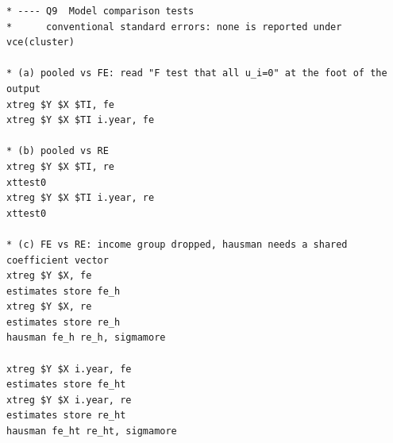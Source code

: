 \documentclass[11pt,a4paper]{article}
\begin{document}
\begin{footnotesize}
\begin{verbatim}
* ---- Q9  Model comparison tests
*      conventional standard errors: none is reported under vce(cluster)

* (a) pooled vs FE: read "F test that all u_i=0" at the foot of the output
xtreg $Y $X $TI, fe
xtreg $Y $X $TI i.year, fe

* (b) pooled vs RE
xtreg $Y $X $TI, re
xttest0
xtreg $Y $X $TI i.year, re
xttest0

* (c) FE vs RE: income group dropped, hausman needs a shared coefficient vector
xtreg $Y $X, fe
estimates store fe_h
xtreg $Y $X, re
estimates store re_h
hausman fe_h re_h, sigmamore

xtreg $Y $X i.year, fe
estimates store fe_ht
xtreg $Y $X i.year, re
estimates store re_ht
hausman fe_ht re_ht, sigmamore
\end{verbatim}
\end{footnotesize}
\end{document}
